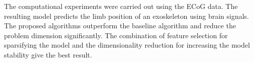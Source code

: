 \documentclass[preprint,authoryear,12pt]{elsarticle}
\theoremstyle{definition}
\begin{document}
The computational experiments were carried out using the ECoG data. 
The resulting model predicts the limb position of an exoskeleton using brain signals.
The proposed algorithms outperform the baseline algorithm and reduce the problem dimension significantly.
The combination of feature selection for sparsifying the model and the dimensionality reduction for increasing the model stability give the best result.



\end{document}
